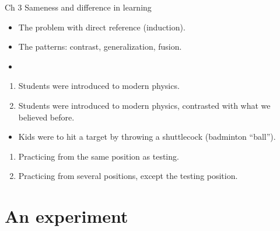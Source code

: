\begin{frame}
  \begin{block}{Ch 3 Sameness and difference in learning}
    \begin{itemize}
      \item The problem with direct reference (induction).
      \item The patterns: contrast, generalization, fusion.
      \item {}
    \end{itemize}
  \end{block}
\end{frame}

\begin{frame}
  \begin{example}[Physics]
    \begin{enumerate}
      \item Students were introduced to modern physics.
      \item Students were introduced to modern physics, contrasted with what we 
        believed before.
    \end{enumerate}
  \end{example}
\end{frame}

\begin{frame}
  \begin{example}
    \begin{itemize}
      \item Kids were to hit a target by throwing a shuttlecock (badminton 
        \enquote{ball}).
    \end{itemize}
    \begin{enumerate}
      \item Practicing from the same position as testing.
      \item Practicing from several positions, except the testing position.
    \end{enumerate}
  \end{example}
\end{frame}

\section{An experiment}

